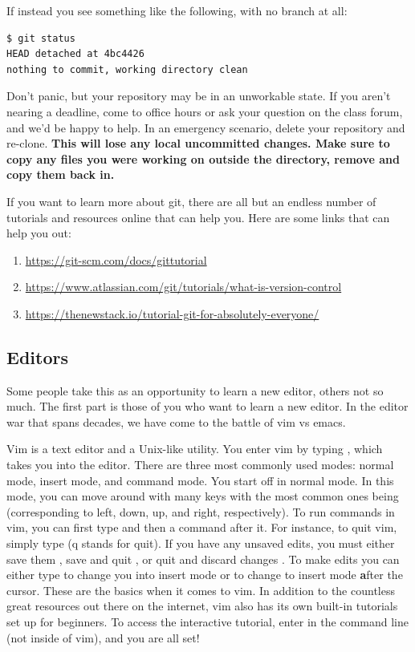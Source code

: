 If instead you see something like the following, with no branch at all:

\begin{lstlisting}[language=bash]
$ git status
HEAD detached at 4bc4426
nothing to commit, working directory clean
\end{lstlisting}

Don't panic, but your repository may be in an unworkable state.
If you aren't nearing a deadline, come to office hours or ask your question on the class forum, and we'd be happy to help.
In an emergency scenario, delete your repository and re-clone.
\textbf{This will lose any local uncommitted changes. Make sure to copy any files you were working on outside the directory, remove and copy them back in.}

If you want to learn more about git, there are all but an endless number of tutorials and resources online that can help you.
Here are some links that can help you out:

\begin{enumerate}
\item \url{https://git-scm.com/docs/gittutorial}
\item \url{https://www.atlassian.com/git/tutorials/what-is-version-control}
\item \url{https://thenewstack.io/tutorial-git-for-absolutely-everyone/}
\end{enumerate}

\subsection{Editors}

Some people take this as an opportunity to learn a new editor, others not so much. The first part is those of you who want to learn a new editor. In the editor war that spans decades, we have come to the battle of vim vs emacs.

Vim is a text editor and a Unix-like utility.
You enter vim by typing , which takes you into the editor.
There are three most commonly used modes: normal mode, insert mode, and command mode.
You start off in normal mode.
In this mode, you can move around with many keys with the most common ones being  (corresponding to left, down, up, and right, respectively).
To run commands in vim, you can first type \keyword{:} and then a command after it.
For instance, to quit vim, simply type  (q stands for quit).
If you have any unsaved edits, you must either save them , save and quit , or quit and discard changes .
To make edits you can either type  to change you into insert mode or  to change to insert mode \textbf{a}fter the cursor.
These are the basics when it comes to vim.
In addition to the countless great resources out there on the internet, vim also has its own built-in tutorials set up for beginners.
To access the interactive tutorial, enter  in the command line (not inside of vim), and you are all set!

